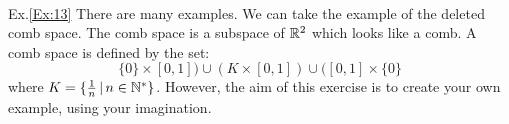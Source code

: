 \, 

Ex.\ref{Ex:13} There are many examples. We can take the example of the deleted comb space. The comb space is a subspace of $\mathbb{R}^2$ which looks like a comb. A comb space is defined by the set: 
\[\{0\} \times [0,1] ) \cup (K \times [0,1]) \cup ([0,1] \times \{0\}\]
where $K=\{\frac{1}{n}\, |\, n\in\mathbb{N}^*\}$.
However, the aim of this exercise is to create your own example, using your imagination. 
















